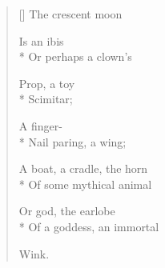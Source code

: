 \label{ch:over_venezia}
\settowidth{\versewidth}{                          Wink.}
\begin{verse}[\versewidth]
The crescent moon

Is an ibis\\*
Or perhaps a clown's

Prop, a toy\\*
Scimitar;

A finger-\\*
Nail paring, a wing;

A boat, a cradle, the horn\\*
Of some mythical animal

Or god, the earlobe\\*
Of a goddess, an immortal

\hspace*{3\vgap} Wink.
\end{verse}
